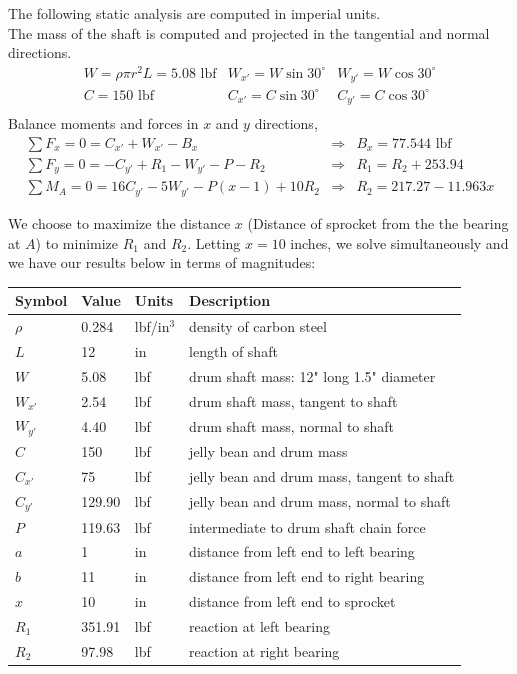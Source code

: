 \documentclass[letterpaper,12pt]{article}
\begin{document}
\noindent The following static analysis are computed in imperial units.\\
The mass of the shaft is computed and projected in the tangential and normal directions.
\[ \begin{array}{lll}%
 W = \rho \pi r^2 L = 5.08 \text{ lbf} &  W_{x'} = W\sin{30^\circ}  &  W_{y'} = W\cos{30^\circ}\\
C = 150 \text{ lbf} &  C_{x'} = C\sin{30^\circ} &  C_{y'} = C\cos{30^\circ}\\
\end{array}\]%
Balance moments and forces in $x$ and $y$ directions,
\[ \begin{array}{lll}%
 \sum F_x = 0 = C_{x'} + W_{x'} - B_{x} &\Rightarrow& B_{x} = 77.544 \text{ lbf}\\
 \sum F_y = 0 = -C_{y'} + R_1 - W_{y'} - P - R_2 &\Rightarrow& R_1 = R_2 + 253.94\\
 \sum M_{A} = 0 = 16C_{y'} - 5W_{y'} - P(x-1) + 10R_2 &\Rightarrow& R_2 = 217.27 - 11.963x
\end{array}\]%

We choose to maximize the distance $x$ (Distance of sprocket from the the bearing at $A$) to minimize $R_1$ and $R_2$. Letting $x = 10$ inches, we solve simultaneously and we have our results below in terms of magnitudes:

\begin{center}
	\begin{tabular}{ |p{1.5cm}||p{1.5cm}|p{2cm}|p{7cm}|  }
		\hline
		Symbol & Value & Units & Description\\
		\hline
		$\rho$ & 0.284 & lbf/in$^3$ & density of carbon steel\\
	    $L$ & 12 & in & length of shaft\\
		\hline
		$W$ & 5.08 & lbf  & drum shaft mass: 12" long 1.5" diameter\\
		$W_{x'}$ & 2.54 & lbf  & drum shaft mass, tangent to shaft\\
		$W_{y'}$ & 4.40 & lbf  & drum shaft mass, normal to shaft\\
        $C$ & 150 & lbf & jelly bean and drum mass\\
        $C_{x'}$ & 75 & lbf  & jelly bean and drum mass, tangent to shaft\\		
		$C_{y'}$ & 129.90 & lbf  & jelly bean and drum mass, normal to shaft\\
		$P$ & 119.63 & lbf  & intermediate to drum shaft chain force\\
		\hline
		$a$ & 1 & in  & distance from left end to left bearing\\
		$b$ & 11 & in  & distance from left end to right bearing\\
		$x$ & 10 & in  & distance from left end to sprocket \\
		\hline
		$R_1$ & 351.91 & lbf  & reaction at left bearing\\
		$R_2$ & 97.98 & lbf  & reaction at right bearing\\
		\hline
	\end{tabular}
\end{center}
\end{document}
